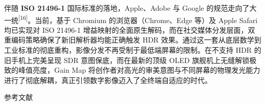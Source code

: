 \documentclass[12pt, a4paper]{ctexart}
\newcommand{\scite}[1]{\textsuperscript{[#1]}}
\begin{document}
伴随 \textbf{ISO 21496-1} 国际标准的落地，Apple、Adobe 与 Google 的规范走向了大一统\scite{16}。当前，基于 Chromium 的浏览器（Chrome、Edge 等）及 Apple Safari 均已实现对 ISO 21496-1 增益映射的全面原生解码，而在社交媒体分发层面，双重编码策略确保了新旧解析器均能正确触发 HDR 效果。通过这一套从底层数学到工业标准的彻底重构，影像分发不再受制于最低端屏幕的限制。在不支持 HDR 的旧手机上完美呈现 SDR 意图保底，而在最新的顶级 OLED 旗舰机上无缝解锁极致的峰值亮度，Gain Map 将创作者对高光的审美意图与不同屏幕的物理发光能力进行了彻底解耦，真正引领数字影像迈入了全终端自适应的时代。

\newpage
{}
\begin{center}
    {\heiti{} 参考文献}
\end{center}
\vspace{1em}
\end{document}
